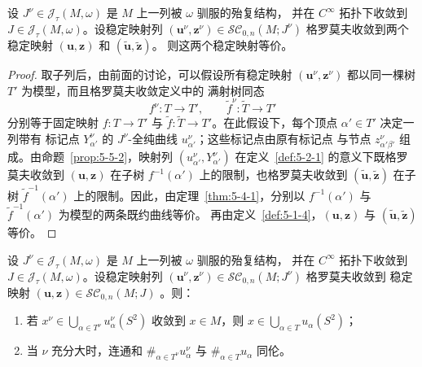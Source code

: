 \begin{theorem}[极限的唯一性]\label{thm:5-5-3}
设 $J^\nu\in\mathcal J_\tau(M,\omega)$ 是 $M$ 上一列被 $\omega$ 驯服的殆复结构，
并在 $C^\infty$ 拓扑下收敛到 $J\in\mathcal J_\tau(M,\omega)$。设稳定映射列
$(\mathbf u^\nu,\mathbf z^\nu)\in\mathcal{SC}_{0,n}(M;J^\nu)$ 格罗莫夫收敛到两个
稳定映射 $(\mathbf u,\mathbf z)$ 和 $(\widetilde{\mathbf u},\widetilde{\mathbf z})$。
则这两个稳定映射等价。
\end{theorem}

\begin{proof}
取子列后，由前面的讨论，可以假设所有稳定映射
$(\mathbf u^\nu,\mathbf z^\nu)$ 都以同一棵树 $T'$ 为模型，而且格罗莫夫收敛定义中的
满射树同态
\[
  f^\nu:T\to T',
  \qquad
  \widetilde f^\nu:\widetilde T\to T'
\]
分别等于固定映射 $f:T\to T'$ 与
$\widetilde f:\widetilde T\to T'$。在此假设下，每个顶点 $\alpha'\in T'$ 决定一列带有
标记点 $Y_{\alpha'}^\nu$ 的 $J^\nu$-全纯曲线 $u_{\alpha'}^\nu$；这些标记点由原有标记点
与节点 $z_{\alpha'\beta'}^\nu$ 组成。由命题~\ref{prop:5-5-2}，映射列
$(u_{\alpha'}^\nu,Y_{\alpha'}^\nu)$ 在定义~\ref{def:5-2-1} 的意义下既格罗莫夫收敛到
$(\mathbf u,\mathbf z)$ 在子树 $f^{-1}(\alpha')$ 上的限制，也格罗莫夫收敛到
$(\widetilde{\mathbf u},\widetilde{\mathbf z})$ 在子树
$\widetilde f^{-1}(\alpha')$ 上的限制。因此，由定理~\ref{thm:5-4-1}，分别以
$f^{-1}(\alpha')$ 与 $\widetilde f^{-1}(\alpha')$ 为模型的两条既约曲线等价。
再由定义~\ref{def:5-1-4}，$(\mathbf u,\mathbf z)$ 与
$(\widetilde{\mathbf u},\widetilde{\mathbf z})$ 等价。
\end{proof}

\begin{theorem}[同伦类的收敛]\label{thm:5-5-4}
设 $J^\nu\in\mathcal J_\tau(M,\omega)$ 是 $M$ 上一列被 $\omega$ 驯服的殆复结构，
并在 $C^\infty$ 拓扑下收敛到 $J\in\mathcal J_\tau(M,\omega)$。设稳定映射列
$(\mathbf u^\nu,\mathbf z^\nu)\in\mathcal{SC}_{0,n}(M;J^\nu)$ 格罗莫夫收敛到
稳定映射
$(\mathbf u,\mathbf z)\in\mathcal{SC}_{0,n}(M;J)$
。则：
\begin{enumerate}[label=(\roman*),leftmargin=3em]
\item 若
$x^\nu\in\bigcup_{\alpha\in T^\nu}u_\alpha^\nu(S^2)$ 收敛到 $x\in M$，则
$x\in\bigcup_{\alpha\in T}u_\alpha(S^2)$；
\item 当 $\nu$ 充分大时，连通和
$\#_{\alpha\in T^\nu}u_\alpha^\nu$ 与
$\#_{\alpha\in T}u_\alpha$ 同伦。
\end{enumerate}
\end{theorem}

